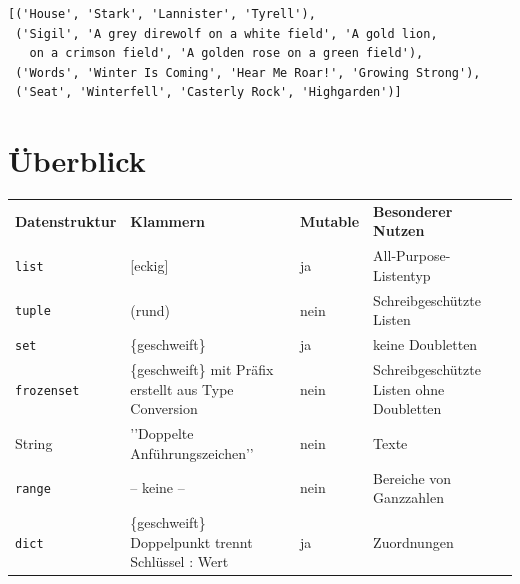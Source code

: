 \begin{cmdbox}[Ausgabe]
\begin{verbatim}
[('House', 'Stark', 'Lannister', 'Tyrell'), 
 ('Sigil', 'A grey direwolf on a white field', 'A gold lion, 
   on a crimson field', 'A golden rose on a green field'), 
 ('Words', 'Winter Is Coming', 'Hear Me Roar!', 'Growing Strong'), 
 ('Seat', 'Winterfell', 'Casterly Rock', 'Highgarden')]  
\end{verbatim}
\end{cmdbox}

\section{Überblick}
{


\begin{tabularx}
	{\linewidth}
	{DKMN}
	\toprule[1.5pt]
	
	\textbf{Datenstruktur} &
	\textbf{Klammern} &
	\textbf{Mutable} & 
	\textbf{Besonderer Nutzen} \\
	
	\texttt{list} &
	[eckig] &
	ja &
	All-Purpose-Listentyp \\
	
	\texttt{tuple} &
	(rund) &
	nein &
	Schreibgeschützte Listen \\
	
	\texttt{set} &
	\{geschweift\} &
	ja &
	keine Doubletten \\
	
	\texttt{frozenset} &
	\{geschweift\} mit Präfix\newline
	erstellt aus Type Conversion &
	nein &
	Schreibgeschützte Listen ohne Doubletten \\
	
	String &
	'{}'Doppelte Anführungszeichen'{}' &
	nein &
	Texte \\
	
	\texttt{range} &
	-- keine -- &
	nein &
	Bereiche von Ganzzahlen \\
	
	\texttt{dict} &
	\{geschweift\}\newline
	Doppelpunkt trennt Schlüssel : Wert &
	ja &
	Zuordnungen \\
	
	\bottomrule[1.5pt]
\end{tabularx}
}

